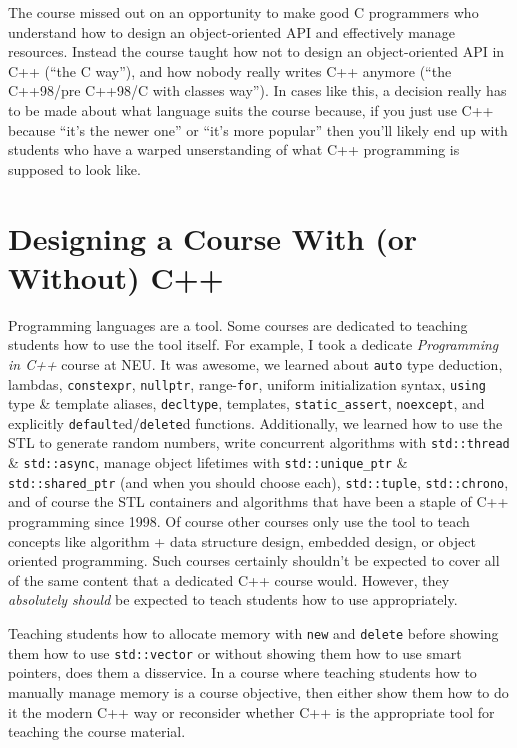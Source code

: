 \documentclass{article}
\newcommand{\CppNew}{\lstinline{new}}
\newcommand{\CppDelete}{\lstinline{delete}}
\newcommand{\NewAndDelete}{\CppNew{} and \CppDelete{}}
\begin{document}
The course missed out on an opportunity to make good C programmers who understand how to design an object-oriented API and effectively manage resources.  Instead the course taught how not to design an object-oriented API in C++ (``the C way''), and how nobody really writes C++ anymore (``the C++98/pre C++98/C with classes way'').  In cases like this, a decision really has to be made about what language suits the course because, if you just use C++ because ``it's the newer one'' or ``it's more popular'' then you'll likely end up with students who have a warped unserstanding of what C++ programming is supposed to look like.

\section*{Designing a Course With (or Without) C++}
Programming languages are a tool.  Some courses are dedicated to teaching students how to use the tool itself. For example, I took a dedicate \emph{Programming in C++} course at NEU.  It was awesome, we learned about \lstinline{auto} type deduction, lambdas, \lstinline{constexpr}, \lstinline{nullptr}, range-\lstinline{for}, uniform initialization syntax, \lstinline{using} type \& template aliases, \lstinline{decltype}, templates, \lstinline{static_assert}, \lstinline{noexcept}, and explicitly \lstinline{default}ed/\lstinline{delete}d functions.  Additionally, we learned how to use the STL to generate random numbers, write concurrent algorithms with \lstinline{std::thread} \& \lstinline{std::async}, manage object lifetimes with \lstinline{std::unique_ptr} \& \lstinline{std::shared_ptr} (and when you should choose each), \lstinline{std::tuple}, \lstinline{std::chrono}, and of course the STL containers and algorithms that have been a staple of C++ programming since 1998.  Of course other courses only use the tool to teach concepts like algorithm + data structure design, embedded design, or object oriented programming.  Such courses certainly shouldn't be expected to cover all of the same content that a dedicated C++ course would.  However, they \emph{absolutely should} be expected to teach students how to use appropriately.  

Teaching students how to allocate memory with \NewAndDelete{} before showing them how to use \lstinline{std::vector} or without showing them how to use smart pointers, does them a disservice.  In a course where teaching students how to manually manage memory is a course objective, then either show them how to do it the modern C++ way or reconsider whether C++ is the appropriate tool for teaching the course material.  

\end{document}
